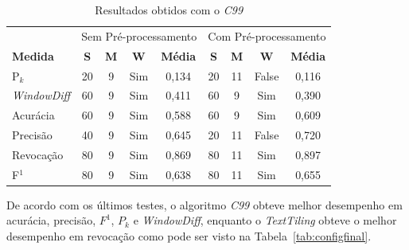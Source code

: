 \begin{table}[!h]
	\centering
	\begin{tabular}{|l||c|c|c|c||c|c|c|c|} \hline

		& \multicolumn{4}{c||}{Sem Pré-processamento} 
		& \multicolumn{4}{c|}{Com Pré-processamento}\\			

		\textbf{Medida} & 
		\textbf{S} & 
		\textbf{M} & 
		\textbf{W} & 
		\textbf{Média} &
		\textbf{S} & 
		\textbf{M} & 
		\textbf{W} & 
		\textbf{Média} \\	\hline

		P$_k$				& 20 & 9 & Sim & 0,134& 20 & 11 & False	& 0,116 \\ \hline  
		\textit{WindowDiff}	& 60 & 9 & Sim & 0,411& 60 &  9 & Sim 	& 0,390 \\ \hline  
		Acurácia			& 60 & 9 & Sim & 0,588& 60 &  9 & Sim 	& 0,609 \\ \hline  
		Precisão			& 40 & 9 & Sim & 0,645& 20 & 11 & False	& 0,720 \\ \hline  
		Revocação			& 80 & 9 & Sim & 0,869& 80 & 11 & Sim 	& 0,897 \\ \hline  
		F$^1$				& 80 & 9 & Sim & 0,638& 80 & 11 & Sim 	& 0,655 \\ \hline  

	\end{tabular}
	\caption{Resultados obtidos com o \textit{C99}}
	\label{tab:resultadosc99}
\end{table}




De acordo com os últimos testes, o algoritmo \textit{C99} obteve melhor desempenho em acurácia, precisão, $F^1$, $P_k$ e \textit{WindowDiff}, enquanto o \textit{TextTiling} obteve o melhor desempenho em revocação como pode ser visto na Tabela~\ref{tab:configfinal}. 











